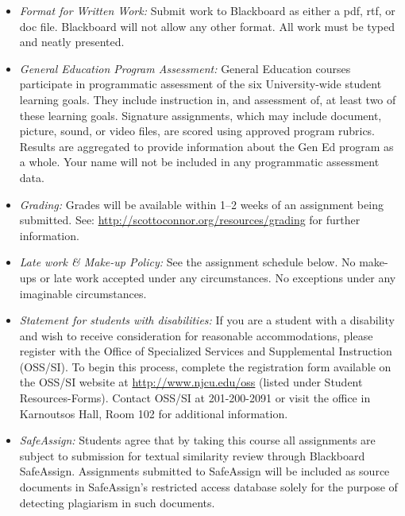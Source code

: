 \documentclass[article,oneside]{memoir}
\begin{document}
\begin{itemize}
\item \textit{Format for Written Work:} Submit work to Blackboard as either a pdf, rtf, or doc file. Blackboard will not allow any other format. All work must be typed and neatly presented. 


\item \textit{General Education Program Assessment:} General Education courses participate in programmatic assessment of the six University-wide student learning goals. They include instruction in, and assessment of, at least two of these learning goals. Signature assignments, which may include document, picture, sound, or video files, are scored using approved program rubrics. Results are aggregated to provide information about the Gen Ed program as a whole. Your name will not be included in any programmatic assessment data.

\item \textit{Grading:} Grades will be available within 1--2 weeks of an assignment being submitted. See: \href{http://scottoconnor.org/resources/grading}{http://scottoconnor.org/resources/grading} for further information.


\item \textit{Late work \& Make-up Policy:} See the assignment schedule below. No make-ups or late work accepted under any circumstances. No exceptions under any imaginable circumstances.

\item \textit{Statement for students with disabilities:} If you are a student
with a disability and wish to receive consideration for reasonable
accommodations, please register with the Office of Specialized Services
and Supplemental Instruction (OSS/SI). To begin this process, complete
the registration form available on the OSS/SI website at
\href{http://www.njcu.edu/oss}{http://www.njcu.edu/oss}
(listed under Student Resources-Forms). Contact OSS/SI at 201-200-2091
or visit the office in Karnoutsos Hall, Room 102 for additional
information.



\item \textit{SafeAssign:} Students agree that by taking this course all assignments are subject to submission for textual similarity review through Blackboard SafeAssign. Assignments submitted to SafeAssign will be included as source documents in SafeAssign's restricted access database solely for the purpose of detecting plagiarism in such documents.  



\end{itemize}
\end{document}
